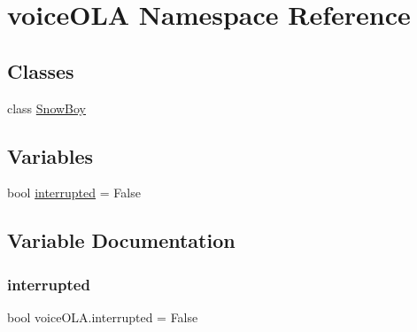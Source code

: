 \hypertarget{namespacevoiceOLA}{}\section{voice\+O\+LA Namespace Reference}
\label{namespacevoiceOLA}
\subsection*{Classes}
\begin{DoxyCompactItemize}
\item 
class \hyperlink{classvoiceOLA_1_1SnowBoy}{Snow\+Boy}
\end{DoxyCompactItemize}
\subsection*{Variables}
\begin{DoxyCompactItemize}
\item 
bool \hyperlink{namespacevoiceOLA_a3a6b55040aa1eb602e4efbf0b4f30a09}{interrupted} = False
\end{DoxyCompactItemize}


\subsection{Variable Documentation}
\mbox{\label{namespacevoiceOLA_a3a6b55040aa1eb602e4efbf0b4f30a09}} 
\subsubsection{\texorpdfstring{interrupted}{interrupted}}
{\footnotesize\ttfamily bool voice\+O\+L\+A.\+interrupted = False}

